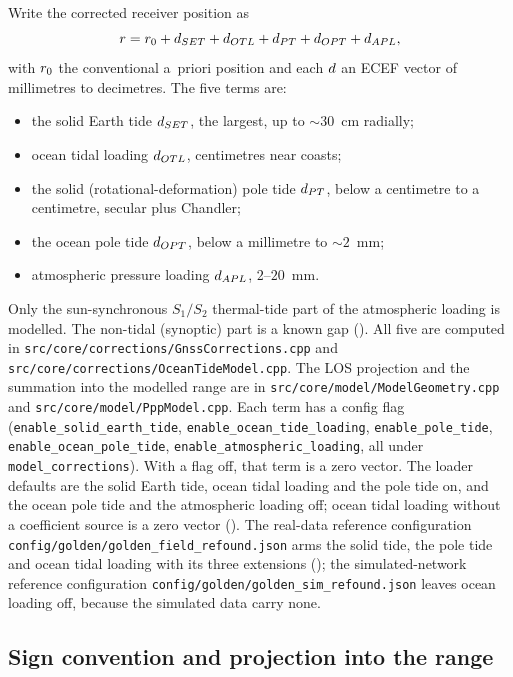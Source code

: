 \documentclass[main.tex]{subfiles}
\begin{document}
Write the corrected receiver position as
\begin{equation}
r = r_0 + d_{SET} + d_{OTL} + d_{PT} + d_{OPT} + d_{APL} ,
\label{eq:sitedisp-sum}
\end{equation}
with $r_0$ the conventional a~priori position and each $d$ an
ECEF vector of millimetres to decimetres.  The five terms are:
\begin{itemize}
\item the solid Earth tide $d_{SET}$, the largest, up to $\sim\!30$~cm
      radially;
\item ocean tidal loading $d_{OTL}$, centimetres near coasts;
\item the solid (rotational-deformation) pole tide $d_{PT}$, below a
      centimetre to a centimetre, secular plus Chandler;
\item the ocean pole tide $d_{OPT}$, below a millimetre to
      $\sim\!2$~mm;
\item atmospheric pressure loading $d_{APL}$, $2$--$20$~mm.
\end{itemize}
Only the sun-synchronous $S_1/S_2$ thermal-tide part of the atmospheric
loading is modelled.  The non-tidal (synoptic) part is a known gap
().  All five are computed in
\texttt{src/core/corrections/GnssCorrections.cpp} and
\texttt{src/core/corrections/OceanTideModel.cpp}.  The LOS projection
and the summation into the modelled range are in
\texttt{src/core/model/ModelGeometry.cpp} and
\texttt{src/core/model/PppModel.cpp}.  Each term has a config flag
(\texttt{enable\_solid\_earth\_tide}, \texttt{enable\_ocean\_tide\_loading},
\texttt{enable\_pole\_tide}, \texttt{enable\_ocean\_pole\_tide},
\texttt{enable\_atmospheric\_loading}, all under
\texttt{model\_corrections}).  With a flag off, that term is
a zero vector.  The loader defaults are the solid Earth tide, ocean tidal
loading and the pole tide on, and the ocean pole tide and the atmospheric
loading off; ocean tidal loading without a coefficient source is a zero
vector ().  The real-data reference
configuration \texttt{config/golden/golden\_field\_refound.json} arms the
solid tide, the pole tide and ocean tidal loading with its three
extensions (); the simulated-network reference
configuration \texttt{config/golden/golden\_sim\_refound.json} leaves
ocean loading off, because the simulated data carry none.

\subsection{Sign convention and projection into the range}
\label{sec:sitedisp-projection}
\end{document}
